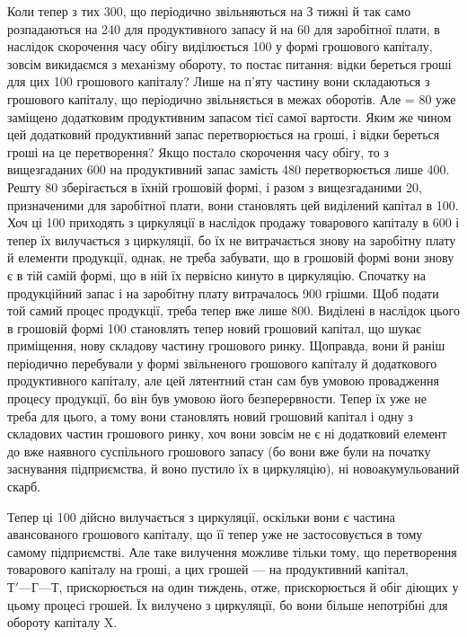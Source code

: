 Коли тепер з тих 300, що періодично звільняються на З
тижні й так само розпадаються на 240 для продуктивного запасу
й на 60 для заробітної плати, в наслідок скорочення часу
обігу виділюється 100 у формі грошового капіталу, зовсім викидаємся
з механізму обороту, то постає питання: відки береться гроші
для цих 100 грошового капіталу? Лише на п’яту частину вони
складаються з грошового капіталу, що періодично звільняється в межах
оборотів. Але  = 80 уже заміщено додатковим продуктивним
запасом тієї самої вартости. Яким же чином цей додатковий продуктивний
запас перетворюється на гроші, і відки береться гроші на це перетворення?
Якщо постало скорочення часу обігу, то з вищезгаданих 600
на продуктивний запас замість 480 перетворюється лише 400. Решту 80 зберігається в їхній грошовій формі, і
разом з вищезгаданими 20, призначеними для заробітної плати,
вони становлять цей виділений капітал в 100. Хоч ці 100 приходять з циркуляції в наслідок продажу товарового капіталу в
600 і тепер їх вилучається з циркуляції, бо їх не витрачається
знову на заробітну плату й елементи продукції, однак, не треба забувати,
що в грошовій формі вони знову є в тій самій формі, що в ній їх
первісно кинуто в циркуляцію. Спочатку на продукційний запас і на заробітну
плату витрачалось 900 грішми. Щоб подати той
самий процес продукції, треба тепер вже лише 800. Виділені в
наслідок цього в грошовій формі 100 становлять тепер новий
грошовий капітал, що шукає приміщення, нову складову частину грошового
ринку. Щоправда, вони й раніш періодично перебували у формі
звільненого грошового капіталу й додаткового продуктивного капіталу,
але цей лятентний стан сам був умовою провадження процесу продукції,
бо він був умовою його безперервности. Тепер їх уже не треба для
цього, а тому вони становлять новий грошовий капітал і одну з складових
частин грошового ринку, хоч вони зовсім не є ні додатковий елемент
до вже наявного суспільного грошового запасу (бо вони вже були
на початку заснування підприємства, й воно пустило їх в циркуляцію),
ні новоакумульований скарб.

Тепер ці 100 дійсно вилучається з циркуляції, оскільки вони
є частина авансованого грошового капіталу, що її тепер уже не застосовується
в тому самому підприємстві. Але таке вилучення можливе
тільки тому, що перетворення товарового капіталу на гроші, а цих грошей
— на продуктивний капітал, $Т' — Г — Т$, прискорюється на один тиждень,
отже, прискорюється й обіг діющих у цьому процесі грошей. Їх вилучено
з циркуляції, бо вони більше непотрібні для обороту капіталу X.

